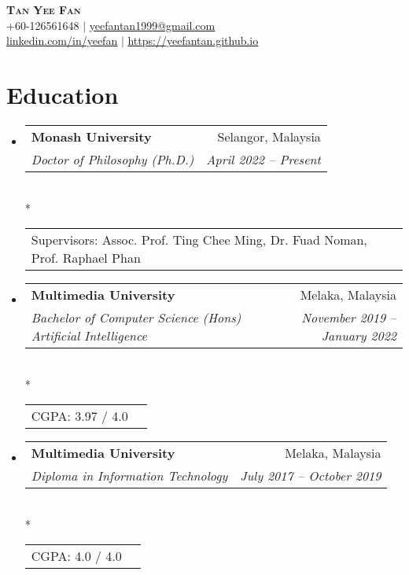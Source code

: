 \documentclass[a4,10pt]{article}
\makeatletter
\newcommand{\resumeSubheading}[4]{
  \vspace{-2pt}\item
    \begin{tabular*}{0.97\textwidth}[t]{l@{\extracolsep{\fill}}r}
      \textbf{#1} & #2 \\
      \textit{\small#3} & \textit{\small #4} \\
    \end{tabular*}\vspace{-7pt}
}
\newcommand{\resumeCGPAA}[1]{
    \vspace{2pt}\\*
    \begin{tabular*}{0.97\textwidth}{l@{\extracolsep{\fill}}r}
      \textup{\footnotesize#1} 
    \end{tabular*}\vspace{-14pt}
}
\newcommand{\resumeCGPA}[1]{
    \vspace{2pt}\\*
    \begin{tabular*}{0.97\textwidth}{l@{\extracolsep{\fill}}r}
      \textup{\footnotesize#1} 
    \end{tabular*}\vspace{-7pt}
}
\newcommand{\resumeSubHeadingListStart}{\begin{itemize}[leftmargin=0.15in, label={}]}
\newcommand{\resumeSubHeadingListEnd}{\end{itemize}}
\makeatother
\begin{document}

\begin{center}
    \textbf{ \LARGE \scshape Tan Yee Fan} \\ \vspace{2pt}
    \small +60-126561648 $|$ \href{mailto:yeefantan1999@gmail.com}{\underline{yeefantan1999@gmail.com}} 
         \\ \vspace{2pt}
    \small  
    \href{https://linkedin.com/in/yeefan}{\underline{linkedin.com/in/yeefan}} $|$  \href{https://yeefantan.github.io}{\underline{https://yeefantan.github.io}} 
\end{center}


\section{Education}
  \resumeSubHeadingListStart
  \resumeSubheading
  {Monash University}{Selangor, Malaysia}
  {Doctor of Philosophy (Ph.D.)}{April 2022 -- Present}
  \resumeCGPAA
  { Supervisors: Assoc. Prof. Ting Chee Ming, Dr. Fuad Noman, Prof. Raphael Phan }
    \resumeSubheading
      {Multimedia University}{Melaka, Malaysia}
      {Bachelor of  Computer Science (Hons) Artificial Intelligence}{November 2019 -- January 2022}
    \resumeCGPAA
    	{ CGPA: 3.97 / 4.0 }
    \resumeSubheading
      {Multimedia University}{Melaka, Malaysia}
      {Diploma in Information Technology}{July 2017 -- October 2019}
    \resumeCGPA
    	{ CGPA: 4.0 / 4.0}
  \resumeSubHeadingListEnd
\end{document}
